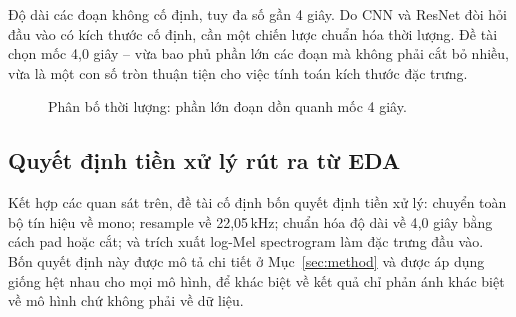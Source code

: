 Độ dài các đoạn không cố định, tuy đa số gần 4 giây. Do CNN và ResNet đòi hỏi đầu
vào có kích thước cố định, cần một chiến lược chuẩn hóa thời lượng. Đề tài chọn
mốc 4{,}0 giây -- vừa bao phủ phần lớn các đoạn mà không phải cắt bỏ nhiều, vừa
là một con số tròn thuận tiện cho việc tính toán kích thước đặc trưng.

\begin{figure}[H]
  \centering
  \caption{Phân bố thời lượng: phần lớn đoạn dồn quanh mốc 4 giây.}
  \label{fig:dur}
\end{figure}

\subsection{Quyết định tiền xử lý rút ra từ EDA}

Kết hợp các quan sát trên, đề tài cố định bốn quyết định tiền xử lý: chuyển toàn
bộ tín hiệu về mono; resample về 22{,}05\,kHz; chuẩn hóa độ dài về 4{,}0 giây
bằng cách pad hoặc cắt; và trích xuất log-Mel spectrogram làm đặc trưng đầu vào.
Bốn quyết định này được mô tả chi tiết ở Mục~\ref{sec:method} và được áp dụng
giống hệt nhau cho mọi mô hình, để khác biệt về kết quả chỉ phản ánh khác biệt về
mô hình chứ không phải về dữ liệu.
